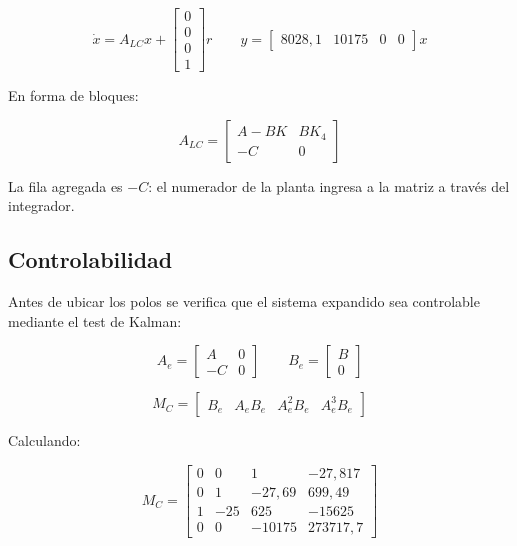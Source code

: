 \documentclass[12pt,a4paper]{article}
\begin{document}
\begin{equation}\dot{x}=A_{LC}x+\begin{bmatrix}0\\0\\0\\1\end{bmatrix}r \qquad y=\begin{bmatrix}8028{,}1&10175&0&0\end{bmatrix}x\end{equation}

En forma de bloques:

\begin{equation}A_{LC}=\begin{bmatrix}A-BK&BK_4\\-C&0\end{bmatrix}\end{equation}

La fila agregada es $-C$: el numerador de la planta ingresa a la matriz a través del integrador.
\subsection*{Controlabilidad}
Antes de ubicar los polos se verifica que el sistema expandido sea controlable mediante el test de Kalman:

\begin{equation}A_e=\begin{bmatrix}A&0\\-C&0\end{bmatrix} \qquad B_e=\begin{bmatrix}B\\0\end{bmatrix}\end{equation}

\begin{equation}M_C=\begin{bmatrix}B_e&A_eB_e&A_e^2B_e&A_e^3B_e\end{bmatrix}\end{equation}

Calculando:

\begin{equation}M_C=\begin{bmatrix}0&0&1&-27{,}817\\0&1&-27{,}69&699{,}49\\1&-25&625&-15625\\0&0&-10175&273717{,}7\end{bmatrix}\end{equation}
\end{document}
